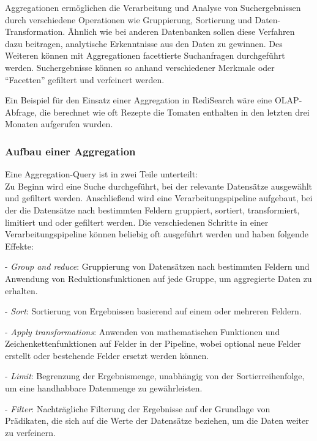 Aggregationen ermöglichen die Verarbeitung und Analyse von Suchergebnissen durch verschiedene Operationen wie Gruppierung, Sortierung und Daten-Transformation. Ähnlich wie bei anderen Datenbanken sollen diese Verfahren dazu beitragen, analytische Erkenntnisse aus den Daten zu gewinnen. Des Weiteren können mit Aggregationen facettierte Suchanfragen durchgeführt werden. Suchergebnisse können so anhand verschiedener Merkmale oder \enquote{Facetten} gefiltert und verfeinert werden.

Ein Beispiel für den Einsatz einer Aggregation in RediSearch wäre eine OLAP-Abfrage, die berechnet wie oft Rezepte die Tomaten enthalten in den letzten drei Monaten aufgerufen wurden.

\subsubsection{Aufbau einer Aggregation}
Eine Aggregation-Query ist in zwei Teile unterteilt:\\
Zu Beginn wird eine Suche durchgeführt, bei der relevante Datensätze ausgewählt und gefiltert werden.
Anschließend wird eine Verarbeitungspipeline aufgebaut, bei der die Datensätze nach bestimmten Feldern gruppiert, sortiert, transformiert, limitiert und oder gefiltert werden. Die verschiedenen Schritte in einer Verarbeitungspipeline können beliebig oft ausgeführt werden und haben folgende Effekte:

- \emph{Group and reduce}: Gruppierung von Datensätzen nach bestimmten Feldern und Anwendung von Reduktionsfunktionen auf jede Gruppe, um aggregierte Daten zu erhalten.
    
- \emph{Sort}: Sortierung von Ergebnissen basierend auf einem oder mehreren Feldern.
    
- \emph{Apply transformations}: Anwenden von mathematischen Funktionen und Zeichenkettenfunktionen auf Felder in der Pipeline, wobei optional neue Felder erstellt oder bestehende Felder ersetzt werden können.
    
- \emph{Limit}: Begrenzung der Ergebnismenge, unabhängig von der Sortierreihenfolge, um eine handhabbare Datenmenge zu gewährleisten.
    
- \emph{Filter}: Nachträgliche Filterung der Ergebnisse auf der Grundlage von Prädikaten, die sich auf die Werte der Datensätze beziehen, um die Daten weiter zu verfeinern.

